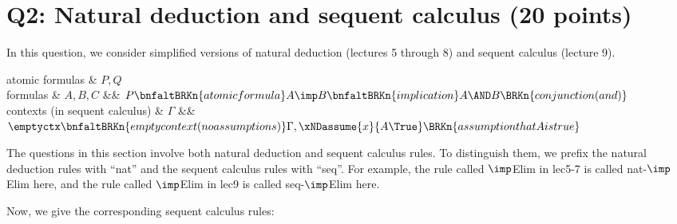 \clearpage


\section{Q2: Natural deduction and sequent calculus (20 points)}

In this question, we consider simplified versions of natural deduction
(lectures 5 through 8) and sequent calculus (lecture 9).

\begin{grammar}
  atomic formulas
  &
  $P, Q$
  \\
  formulas
  &
  $A, B, C$
  &\bnfas&
  $P
  \bnfaltBRKn{atomic formula}
  A \imp B
  \bnfaltBRKn{implication}
  A \AND B
  \BRKn{conjunction (and)}
  $
  \\[1ex]
  contexts (in sequent calculus)
  &
  $\Gamma$
  &\bnfas&
  $\emptyctx \bnfaltBRKn{empty context (no assumptions)}
  \Gamma, \xNDassume{x}{A \True}
  \BRKn{assumption that A is true}
  $
\end{grammar}

The questions in this section involve both natural deduction
and sequent calculus rules.  To distinguish them, we prefix the
natural deduction rules with ``nat'' and the sequent calculus rules
with ``seq''.  For example, the rule called $\imp$Elim in lec5-7
is called nat-$\imp$Elim here, and the rule called $\imp$Elim in lec9
is called seq-$\imp$Elim here.

\bigskip

  \vspace*{-1ex}

Now, we give the corresponding sequent calculus rules:

